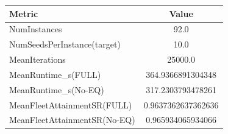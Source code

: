 \begin{tabular}{lc}
\toprule
\textbf{Metric} & \textbf{Value} \\
\midrule
NumInstances & 92.0 \\
NumSeedsPerInstance(target) & 10.0 \\
MeanIterations & 25000.0 \\
MeanRuntime\_s(FULL) & 364.9366891304348 \\
MeanRuntime\_s(No-EQ) & 317.2303793478261 \\
MeanFleetAttainmentSR(FULL) & 0.9637362637362636 \\
MeanFleetAttainmentSR(No-EQ) & 0.965934065934066 \\
\bottomrule
\end{tabular}
